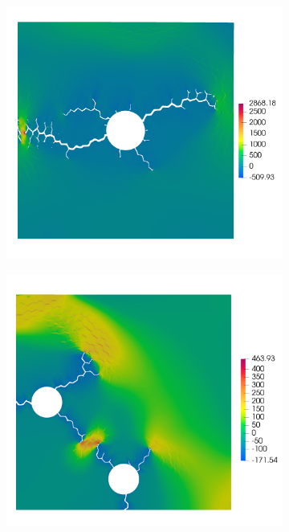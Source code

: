 \begin{frame}
  \vspace{-1.5em}
  \begin{columns}[T]
    \begin{column}{0.2\textwidth}
      \vspace{-1em}
      \begin{figure}
        \centering
        \begin{subfigure}{0.94\linewidth}
          \centering
          \includegraphics[width=0.9\linewidth,scale=0.3]{Chapter345/figures/r25_ext0_stress}
        \end{subfigure}
        \begin{subfigure}{0.94\linewidth}
          \centering
          \includegraphics[width=0.9\linewidth,scale=0.3]{Chapter345/figures/two_bubbles_stress}

\end{subfigure}
\end{figure}
\end{column}
\end{columns}
\end{frame}
